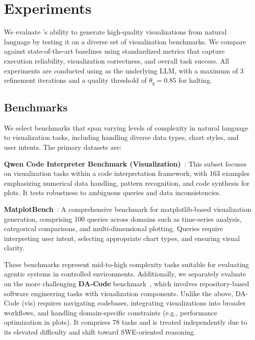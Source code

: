 \section{Experiments}\label{sec:exp}

We evaluate \methodname{}'s ability to generate high-quality visualizations from natural language by testing it on a diverse set of visualization benchmarks. We compare \methodname{} against state-of-the-art baselines using standardized metrics that capture execution reliability, visualization correctness, and overall task success. All experiments are conducted using  as the underlying LLM, with a maximum of 3 refinement iterations and a quality threshold of $\theta_q = 0.85$ for halting. 

\subsection{Benchmarks}
We select benchmarks that span varying levels of complexity in natural language to visualization tasks, including handling diverse data types, chart styles, and user intents. The primary datasets are:


\textbf{Qwen Code Interpreter Benchmark (Visualization)}~\citep{Yang2025Qwen3TR}:
This subset focuses on visualization tasks within a code interpretation framework, with 163 examples emphasizing numerical data handling, pattern recognition, and code synthesis for plots. It tests robustness to ambiguous queries and data inconsistencies.

\textbf{MatplotBench}~\citep{yang2024matplotagent}:
A comprehensive benchmark for matplotlib-based visualization generation, comprising 100 queries across domains such as time-series analysis, categorical comparisons, and multi-dimensional plotting. Queries require interpreting user intent, selecting appropriate chart types, and ensuring visual clarity.


These benchmarks represent mid-to-high complexity tasks suitable for evaluating agentic systems in controlled environments.
Additionally, we separately evaluate on the more challenging \textbf{DA-Code} benchmark~\citep{Huang2024DACodeAD}, which involves repository-based software engineering tasks with visualization components. Unlike the above, DA-Code (vis) requires navigating codebases, integrating visualizations into broader workflows, and handling domain-specific constraints (e.g., performance optimization in plots). It comprises 78 tasks and is treated independently due to its elevated difficulty and shift toward SWE-oriented reasoning.

